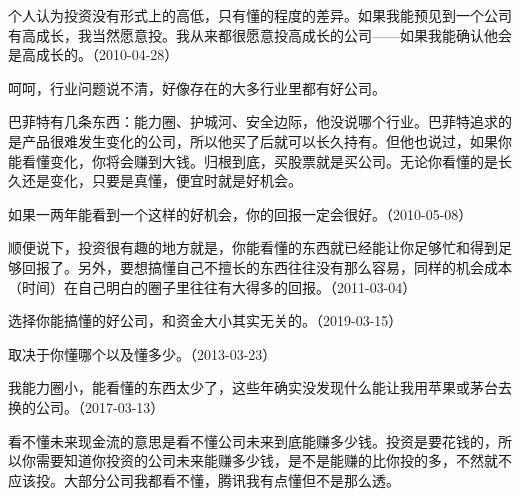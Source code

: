 
个人认为投资没有形式上的高低，只有懂的程度的差异。如果我能预见到一个公司有高成长，我当然愿意投。我从来都很愿意投高成长的公司——如果我能确认他会是高成长的。（2010-04-28）


呵呵，行业问题说不清，好像存在的大多行业里都有好公司。

巴菲特有几条东西：能力圈、护城河、安全边际，他没说哪个行业。巴菲特追求的是产品很难发生变化的公司，所以他买了后就可以长久持有。但他也说过，如果你能看懂变化，你将会赚到大钱。归根到底，买股票就是买公司。无论你看懂的是长久还是变化，只要是真懂，便宜时就是好机会。

如果一两年能看到一个这样的好机会，你的回报一定会很好。（2010-05-08）


顺便说下，投资很有趣的地方就是，你能看懂的东西就已经能让你足够忙和得到足够回报了。另外，要想搞懂自己不擅长的东西往往没有那么容易，同样的机会成本（时间）在自己明白的圈子里往往有大得多的回报。（2011-03-04）


选择你能搞懂的好公司，和资金大小其实无关的。（2019-03-15）


取决于你懂哪个以及懂多少。（2013-03-23）

我能力圈小，能看懂的东西太少了，这些年确实没发现什么能让我用苹果或茅台去换的公司。（2017-03-13）


看不懂未来现金流的意思是看不懂公司未来到底能赚多少钱。投资是要花钱的，所以你需要知道你投资的公司未来能赚多少钱，是不是能赚的比你投的多，不然就不应该投。大部分公司我都看不懂，腾讯我有点懂但不是那么透。

